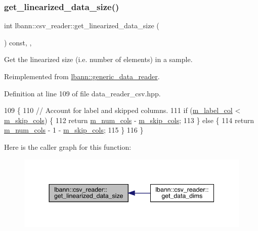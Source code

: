 \subsubsection{\texorpdfstring{get\+\_\+linearized\+\_\+data\+\_\+size()}{get\_linearized\_data\_size()}}
{\footnotesize\ttfamily int lbann\+::csv\+\_\+reader\+::get\+\_\+linearized\+\_\+data\+\_\+size (\begin{DoxyParamCaption}{ }\end{DoxyParamCaption}) const\hspace{0.3cm}{\ttfamily [inline]}, {\ttfamily [override]}, {\ttfamily [virtual]}}



Get the linearized size (i.\+e. number of elements) in a sample. 



Reimplemented from \hyperlink{classlbann_1_1generic__data__reader_a246a719477c8c7b6122d41b6f5618d41}{lbann\+::generic\+\_\+data\+\_\+reader}.



Definition at line 109 of file data\+\_\+reader\+\_\+csv.\+hpp.


\begin{DoxyCode}
109                                                 \{
110     \textcolor{comment}{// Account for label and skipped columns.}
111     \textcolor{keywordflow}{if} (\hyperlink{classlbann_1_1csv__reader_acc02e56c81421c4507f7178ca8461b04}{m\_label\_col} < \hyperlink{classlbann_1_1csv__reader_a3a6cb698fbeb4abd0032e2b018bbb326}{m\_skip\_cols}) \{
112       \textcolor{keywordflow}{return} \hyperlink{classlbann_1_1csv__reader_a7607d3f6b356538671147a0b8f7b09c8}{m\_num\_cols} - \hyperlink{classlbann_1_1csv__reader_a3a6cb698fbeb4abd0032e2b018bbb326}{m\_skip\_cols};
113     \} \textcolor{keywordflow}{else} \{
114       \textcolor{keywordflow}{return} \hyperlink{classlbann_1_1csv__reader_a7607d3f6b356538671147a0b8f7b09c8}{m\_num\_cols} - 1 - \hyperlink{classlbann_1_1csv__reader_a3a6cb698fbeb4abd0032e2b018bbb326}{m\_skip\_cols};
115     \}
116   \}
\end{DoxyCode}
Here is the caller graph for this function\+:\nopagebreak
\begin{figure}[H]
\begin{center}
\leavevmode
\includegraphics[width=344pt]{classlbann_1_1csv__reader_aa1121a406e7af9e97d82e5a945b3b957_icgraph}
\end{center}
\end{figure}
\mbox{\label{classlbann_1_1csv__reader_a2cff8a7ea0fbafebbab71a7731387447}} 
